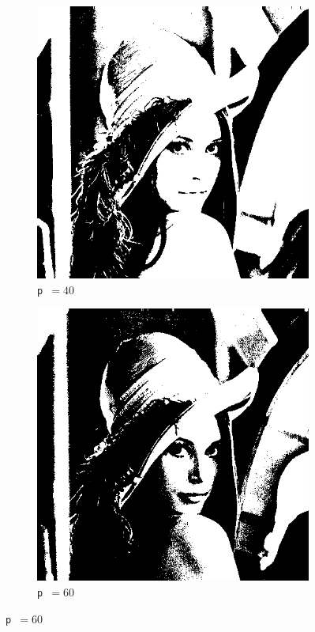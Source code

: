 \documentclass[10pt]{article}
\begin{document}
\begin{figure}[H]
      \vspace{0.02\textwidth}

      \begin{subfigure}[b]{0.33\textwidth}
        \centering
        \includegraphics[width=\textwidth]{img/lena-threshold-40.png}
        \caption*{\texttt{p }\( = 40\)}
      \end{subfigure}
      \hspace{0.2\textwidth}
      \begin{subfigure}[b]{0.33\textwidth}
        \centering
        \includegraphics[width=\textwidth]{img/lena-threshold-60.png}
        \caption*{\texttt{p }\( = 60\)}
      \end{subfigure}


\end{figure}
\end{document}
